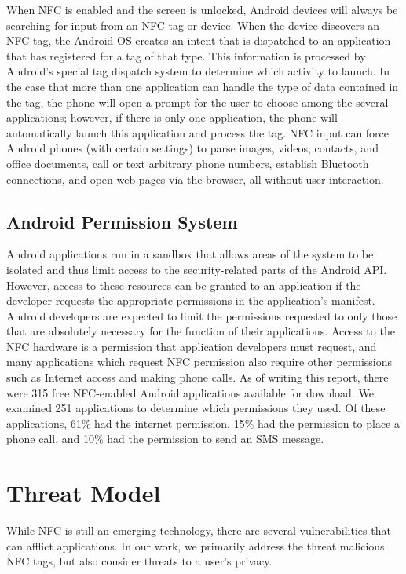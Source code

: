\documentclass[12pt]{article}
\begin{document}
When NFC is enabled and the screen is unlocked, Android devices will always be searching for input from an NFC tag or device. 
When the device discovers an NFC tag, the Android OS creates an intent that is dispatched to an application that has registered for a tag of that type.
This information is processed by Android's special tag dispatch system to determine which activity to launch.
In the case that more than one application can handle the type of data contained in the tag, the phone will open a prompt for the user to choose among the several applications; however, if there is only one application, the phone will automatically launch this application and process the tag.
NFC input can force Android phones (with certain settings) to parse images, videos, contacts, and office documents, call or text arbitrary phone numbers, establish Bluetooth connections, and open web pages via the browser, all without user interaction.  

\subsection{Android Permission System}
\label{sec:androidperm}
Android applications run in a sandbox that allows areas of the system to be isolated and thus limit access to the security-related parts of the Android API.
However, access to these resources can be granted to an application if the developer requests the appropriate permissions in the application's manifest.
Android developers are expected to limit the permissions requested to only those that are absolutely necessary for the function of their applications.
Access to the NFC hardware is a permission that application developers must request, and many applications which request NFC permission also require other permissions such as Internet access and making phone calls.
As of writing this report, there were 315 free NFC-enabled Android applications available for download.
We examined 251 applications to determine which permissions they used.
Of these applications, 61\% had the internet permission, 15\% had the permission to place a phone call, and 10\% had the permission to send an SMS message.

\section{Threat Model}
While NFC is still an emerging technology, there are several vulnerabilities that can afflict applications.
In our work, we primarily address the threat malicious NFC tags, but also consider threats to a user's privacy. 
\end{document}
